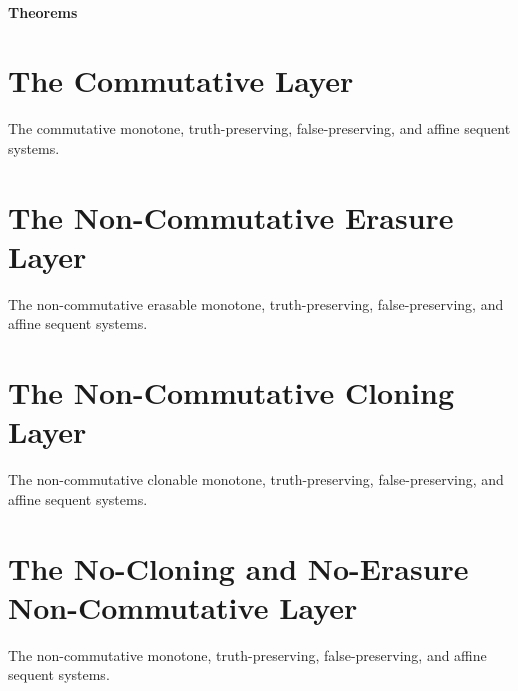 \begin{center}
		\subsection{Theorems}
		\begin{center}
		\end{center}

\end{center}

\part{The Commutative Layer}
\begin{center}
	The commutative monotone, truth-preserving, false-preserving, and affine sequent systems.
\end{center}

\part{The Non-Commutative Erasure Layer}
\begin{center}
	The non-commutative erasable monotone, truth-preserving, false-preserving, and affine sequent systems.
\end{center}

\part{The Non-Commutative Cloning Layer}
\begin{center}
	The non-commutative clonable monotone, truth-preserving, false-preserving, and affine sequent systems.
\end{center}

\part{The No-Cloning and No-Erasure Non-Commutative Layer}
\begin{center}
	The non-commutative monotone, truth-preserving, false-preserving, and affine sequent systems.
\end{center}



